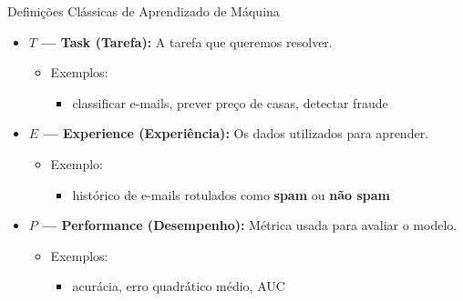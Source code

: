 \documentclass[
  ignorenonframetext,
  aspectratio=169,
]{beamer}
\providecommand{\tightlist}{%
  \setlength{\itemsep}{0pt}\setlength{\parskip}{0pt}}
\begin{document}
\begin{frame}{Definições Clássicas de Aprendizado de Máquina}
\label{definiuxe7uxf5es-cluxe1ssicas-de-aprendizado-de-muxe1quina-1}
\begin{itemize}
\tightlist
\item
  \textbf{\(T\) --- Task (Tarefa):} A tarefa que queremos resolver.

  \begin{itemize}
  \tightlist
  \item
    Exemplos:

    \begin{itemize}
    \tightlist
    \item
      classificar e-mails, prever preço de casas, detectar fraude
    \end{itemize}
  \end{itemize}
\end{itemize}

\pause

\begin{itemize}
\tightlist
\item
  \textbf{\(E\) --- Experience (Experiência):} Os dados utilizados para
  aprender.

  \begin{itemize}
  \tightlist
  \item
    Exemplo:

    \begin{itemize}
    \tightlist
    \item
      histórico de e-mails rotulados como \textbf{spam} ou \textbf{não
      spam}
    \end{itemize}
  \end{itemize}
\end{itemize}

\pause

\begin{itemize}
\tightlist
\item
  \textbf{\(P\) --- Performance (Desempenho):} Métrica usada para
  avaliar o modelo.

  \begin{itemize}
  \tightlist
  \item
    Exemplos:

    \begin{itemize}
    \tightlist
    \item
      acurácia, erro quadrático médio, AUC
    \end{itemize}
  \end{itemize}
\end{itemize}
\end{frame}
\end{document}
